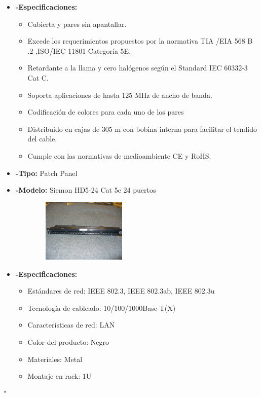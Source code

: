\documentclass{udpreport}
\begin{document}
\begin{itemize}
\begin{figure}[h]
		\end{figure}\\
		\item{\bf-Especificaciones:}
		\begin{itemize}
			\item Cubierta y pares sin apantallar.\\
			\item Excede los requerimientos propuestos por la normativa TIA /EIA 568 B .2 ,ISO/IEC 11801 Categoría 5E.\\
			\item Retardante a la llama y cero halógenos según el Standard IEC 60332-3 Cat C.\\
			\item Soporta aplicaciones de hasta 125 MHz de ancho de banda.\\
			\item Codificación de colores para cada uno de los pares\\
			\item Distribuido en cajas de 305 m con bobina interna para facilitar el tendido del cable.\\
			\item Cumple con las normativas de medioambiente CE y RoHS.\\
		\end{itemize}
		\item{\bf-Tipo:} Patch Panel\\
		\item{\bf-Modelo:} Siemon HD5-24 Cat 5e 24 puertos\\
		\begin{figure}[h]
    		\centering
    	\includegraphics[width=5cm, height=3cm]{patchpanel.png}
		\end{figure}
		\item{\bf-Especificaciones:}
		\begin{itemize}
			\item Estándares de red: IEEE 802.3, IEEE 802.3ab, IEEE 802.3u\\
			\item Tecnología de cableado: 10/100/1000Base-T(X)\\
			\item Características de red: LAN\\
			\item Color del producto: Negro\\
			\item Materiales: Metal\\
			\item Montaje en rack: 1U\\
		\end{itemize}
	\end{itemize}"
\end{document}
